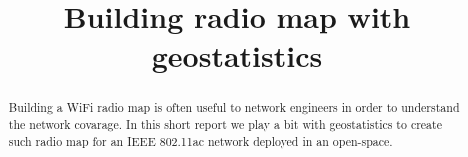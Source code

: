 \documentclass[conference,10pt,letter]{IEEEtran}
\begin{document}
\sloppy
\title{Building radio map with geostatistics}
\maketitle
\begin{abstract}
Building a WiFi radio map is often useful to network engineers in order to understand 
the network covarage. In this short report we play a bit with geostatistics to 
create such radio map for an IEEE 802.11ac network deployed in an open-space.
\end{abstract}

 




\balance


\end{document}
